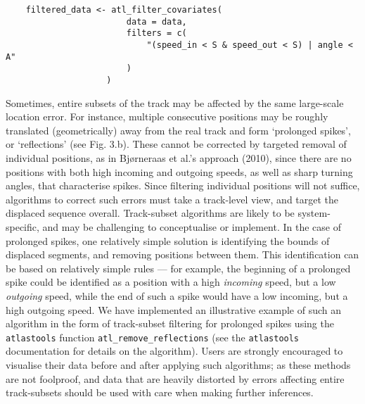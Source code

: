 \begin{refsection}
\begin{lstlisting}
    filtered_data <- atl_filter_covariates(
                        data = data,
                        filters = c(
                            "(speed_in < S & speed_out < S) | angle < A"
                        )
                    )
    \end{lstlisting}

    Sometimes, entire subsets of the track may be affected by the same large-scale location error.
    For instance, multiple consecutive positions may be roughly translated (geometrically) away from the real track and form `prolonged spikes', or `reflections' (see Fig. 3.b).
    These cannot be corrected by targeted removal of individual positions, as in Bjørneraas et al.'s approach (2010), since there are no positions with both high incoming and outgoing speeds, as well as sharp turning angles, that characterise spikes.
    Since filtering individual positions will not suffice, algorithms to correct such errors must take a track-level view, and target the displaced sequence overall.
    Track-subset algorithms are likely to be system-specific, and may be challenging to conceptualise or implement.
    In the case of prolonged spikes, one relatively simple solution is identifying the bounds of displaced segments, and removing positions between them.
    This identification can be based on relatively simple rules --- for example, the beginning of a prolonged spike could be identified as a position with a high \textit{incoming} speed, but a low \textit{outgoing} speed, while the end of such a spike would have a low incoming, but a high outgoing speed.
    We have implemented an illustrative example of such an algorithm in the form of track-subset filtering for prolonged spikes using the \texttt{atlastools} function \texttt{atl\_remove\_reflections} (see the \texttt{atlastools} documentation for details on the algorithm).
    Users are strongly encouraged to visualise their data before and after applying such algorithms; as these methods are not foolproof, and data that are heavily distorted by errors affecting entire track-subsets should be used with care when making further inferences.


\end{refsection}
